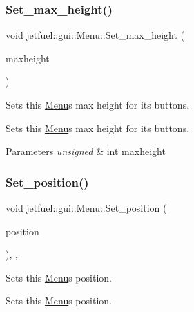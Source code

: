 \subsubsection{\texorpdfstring{Set\+\_\+max\+\_\+height()}{Set\_max\_height()}}
{\footnotesize\ttfamily void jetfuel\+::gui\+::\+Menu\+::\+Set\+\_\+max\+\_\+height (\begin{DoxyParamCaption}\item[{const unsigned int}]{maxheight }\end{DoxyParamCaption})\hspace{0.3cm}{\ttfamily [inline]}}



Sets this \hyperlink{classjetfuel_1_1gui_1_1Menu}{Menu}\textquotesingle{}s max height for it\textquotesingle{}s buttons. 

Sets this \hyperlink{classjetfuel_1_1gui_1_1Menu}{Menu}\textquotesingle{}s max height for it\textquotesingle{}s buttons.


\begin{DoxyParams}{Parameters}
{\em unsigned} & int maxheight \\
\hline
\end{DoxyParams}
\mbox{\label{classjetfuel_1_1gui_1_1Menu_ab575d5e4ad9d86d6781012e7d1bebc9a}} 
\subsubsection{\texorpdfstring{Set\+\_\+position()}{Set\_position()}}
{\footnotesize\ttfamily void jetfuel\+::gui\+::\+Menu\+::\+Set\+\_\+position (\begin{DoxyParamCaption}\item[{\hyperlink{classjetfuel_1_1draw_1_1Vector2d}{jetfuel\+::draw\+::\+Vector2d\+\_\+int}}]{position }\end{DoxyParamCaption})\hspace{0.3cm}{\ttfamily [inline]}, {\ttfamily [override]}, {\ttfamily [virtual]}}



Sets this \hyperlink{classjetfuel_1_1gui_1_1Menu}{Menu}\textquotesingle{}s position. 

Sets this \hyperlink{classjetfuel_1_1gui_1_1Menu}{Menu}\textquotesingle{}s position.


